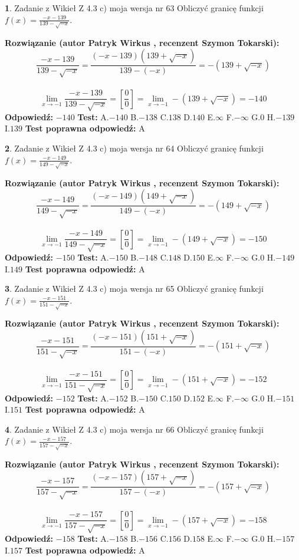 \documentclass[12pt, a4paper]{article}
\theoremstyle{definition} %
\newtheorem{zad}{}
\newcommand{\zadStart}[1]{\begin{zad}#1\newline}
\newcommand{\zadStop}{\end{zad}}
\newcommand{\rozwStart}[2]{\noindent \textbf{Rozwiązanie (autor #1 , recenzent #2): }\newline}
\newcommand{\rozwStop}{\newline}
\newcommand{\odpStart}{\noindent \textbf{Odpowiedź:}\newline}
\newcommand{\odpStop}{\newline}
\newcommand{\testStart}{\noindent \textbf{Test:}\newline}
\newcommand{\testStop}{\newline}
\newcommand{\kluczStart}{\noindent \textbf{Test poprawna odpowiedź:}\newline}
\newcommand{\kluczStop}{\newline}
\begin{document}
\zadStart{Zadanie z Wikieł Z 4.3 c) moja wersja nr 63}
Obliczyć granicę funkcji $f(x)=\frac{-x-139}{139-\sqrt{-x}}$.
\zadStop
\rozwStart{Patryk Wirkus}{Szymon Tokarski}
$$\frac{-x-139}{139-\sqrt{-x}}=\frac{(-x-139)(139+\sqrt{-x})}{139-(-x)}=-(139+\sqrt{-x})$$
\\
$$\lim\limits_{x\to-1}\frac{-x-139}{139-\sqrt{-x}}=[\frac{0}{0}]=\lim\limits_{x\to-1}-(139+\sqrt{-x}) =-140$$
\rozwStop
\odpStart
$-140$
\odpStop
\testStart
A.$-140$
B.$-138$
C.$138$
D.$140$
E.$\infty$
F.$-\infty$
G.$0$
H.$-139$
I.$139$
\testStop
\kluczStart
A
\kluczStop



\zadStart{Zadanie z Wikieł Z 4.3 c) moja wersja nr 64}
Obliczyć granicę funkcji $f(x)=\frac{-x-149}{149-\sqrt{-x}}$.
\zadStop
\rozwStart{Patryk Wirkus}{Szymon Tokarski}
$$\frac{-x-149}{149-\sqrt{-x}}=\frac{(-x-149)(149+\sqrt{-x})}{149-(-x)}=-(149+\sqrt{-x})$$
\\
$$\lim\limits_{x\to-1}\frac{-x-149}{149-\sqrt{-x}}=[\frac{0}{0}]=\lim\limits_{x\to-1}-(149+\sqrt{-x}) =-150$$
\rozwStop
\odpStart
$-150$
\odpStop
\testStart
A.$-150$
B.$-148$
C.$148$
D.$150$
E.$\infty$
F.$-\infty$
G.$0$
H.$-149$
I.$149$
\testStop
\kluczStart
A
\kluczStop



\zadStart{Zadanie z Wikieł Z 4.3 c) moja wersja nr 65}
Obliczyć granicę funkcji $f(x)=\frac{-x-151}{151-\sqrt{-x}}$.
\zadStop
\rozwStart{Patryk Wirkus}{Szymon Tokarski}
$$\frac{-x-151}{151-\sqrt{-x}}=\frac{(-x-151)(151+\sqrt{-x})}{151-(-x)}=-(151+\sqrt{-x})$$
\\
$$\lim\limits_{x\to-1}\frac{-x-151}{151-\sqrt{-x}}=[\frac{0}{0}]=\lim\limits_{x\to-1}-(151+\sqrt{-x}) =-152$$
\rozwStop
\odpStart
$-152$
\odpStop
\testStart
A.$-152$
B.$-150$
C.$150$
D.$152$
E.$\infty$
F.$-\infty$
G.$0$
H.$-151$
I.$151$
\testStop
\kluczStart
A
\kluczStop



\zadStart{Zadanie z Wikieł Z 4.3 c) moja wersja nr 66}
Obliczyć granicę funkcji $f(x)=\frac{-x-157}{157-\sqrt{-x}}$.
\zadStop
\rozwStart{Patryk Wirkus}{Szymon Tokarski}
$$\frac{-x-157}{157-\sqrt{-x}}=\frac{(-x-157)(157+\sqrt{-x})}{157-(-x)}=-(157+\sqrt{-x})$$
\\
$$\lim\limits_{x\to-1}\frac{-x-157}{157-\sqrt{-x}}=[\frac{0}{0}]=\lim\limits_{x\to-1}-(157+\sqrt{-x}) =-158$$
\rozwStop
\odpStart
$-158$
\odpStop
\testStart
A.$-158$
B.$-156$
C.$156$
D.$158$
E.$\infty$
F.$-\infty$
G.$0$
H.$-157$
I.$157$
\testStop
\kluczStart
A
\kluczStop
\end{document}
